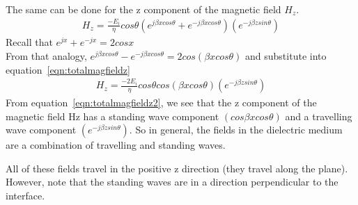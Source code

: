 The same can be done for the z component of the magnetic field $H_z$.
\begin{align}
H_z = \frac{-E_i}{\eta}cos\theta(e^{j\beta xcos\theta} + e^{-j\beta xcos\theta}) (e^{-j\beta zsin\theta})
\label{eqn:totalmagfieldz}
\end{align}  
Recall that $e^{jx} + e^{-jx} = 2cosx$\\
From that analogy, $e^{j\beta xcos \theta} - e^{-j\beta xcos\theta} = 2cos(\beta xcos\theta)$ and substitute into equation~\eqref{eqn:totalmagfieldz}
\begin{align}
H_z = \frac{-2E_i}{\eta}cos\theta cos(\beta xcos\theta) (e^{-j \beta zsin\theta})
\label{eqn:totalmagfieldz2}
\end{align}
From equation~\eqref{eqn:totalmagfieldz2}, we see that the z component of the magnetic field Hz has a standing wave component $(cos\beta xcos\theta)$ and a travelling wave component $(e^{-j\beta zsin\theta})$. So in general, the fields in the dielectric medium are a combination of travelling and standing waves.

All of these fields travel in the positive z direction (they travel along the plane). However, note that the standing waves are in a direction perpendicular to the interface.

